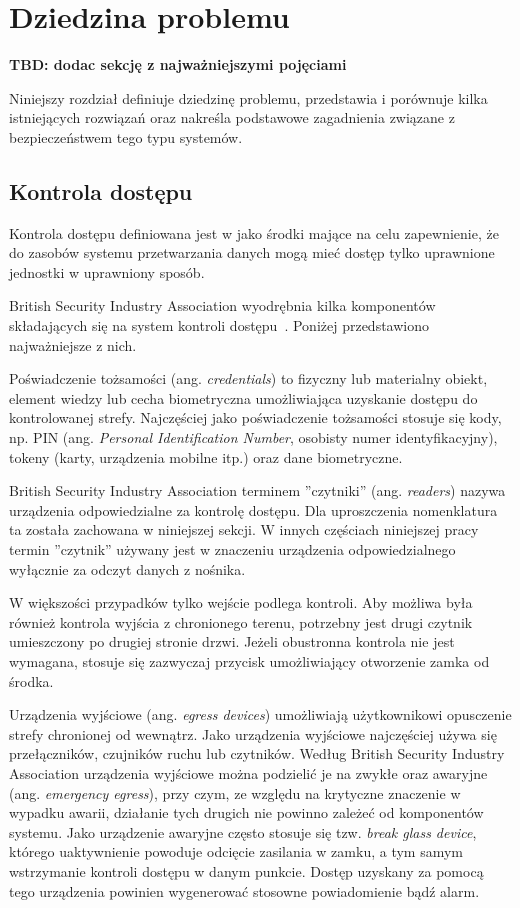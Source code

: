 \chapter{Dziedzina problemu}
\label{chap:problem-domain}
	\textbf{TBD: dodac sekcję z najważniejszymi pojęciami}

	Niniejszy rozdział definiuje dziedzinę problemu, przedstawia i porównuje kilka istniejących rozwiązań oraz nakreśla podstawowe zagadnienia związane z bezpieczeństwem tego typu systemów.

	\section{Kontrola dostępu}

		Kontrola dostępu definiowana jest w \cite{pkn2002} jako środki mające na celu zapewnienie, że do zasobów systemu przetwarzania danych mogą mieć dostęp tylko uprawnione jednostki w uprawniony sposób.

		British Security Industry Association wyodrębnia kilka komponentów składających się na system kontroli dostępu~\cite{bsia2016}. Poniżej przedstawiono najważniejsze z nich.

		Poświadczenie tożsamości (ang. \textit{credentials}) to fizyczny lub materialny obiekt, element wiedzy lub cecha biometryczna umożliwiająca uzyskanie dostępu do kontrolowanej strefy. Najczęściej jako poświadczenie tożsamości stosuje się kody, np. PIN (ang. \textit{Personal Identification Number}, osobisty numer identyfikacyjny), tokeny (karty, urządzenia mobilne itp.) oraz dane biometryczne.

		British Security Industry Association terminem ''czytniki'' (ang. \textit{readers}) nazywa urządzenia odpowiedzialne za kontrolę dostępu. Dla uproszczenia nomenklatura ta została zachowana w niniejszej sekcji. W innych częściach niniejszej pracy termin ''czytnik'' używany jest w znaczeniu urządzenia odpowiedzialnego wyłącznie za odczyt danych z nośnika.

		W większości przypadków tylko wejście podlega kontroli. Aby możliwa była również kontrola wyjścia z chronionego terenu, potrzebny jest drugi czytnik umieszczony po drugiej stronie drzwi. Jeżeli obustronna kontrola nie jest wymagana, stosuje się zazwyczaj przycisk umożliwiający otworzenie zamka od środka.

		Urządzenia wyjściowe (ang. \textit{egress devices}) umożliwiają użytkownikowi opusczenie strefy chronionej od wewnątrz. Jako urządzenia wyjściowe najczęściej używa się przełączników, czujników ruchu lub czytników. Według British Security Industry Association urządzenia wyjściowe można podzielić je na zwykłe oraz awaryjne (ang. \textit{emergency egress}), przy czym, ze względu na krytyczne znaczenie w wypadku awarii, działanie tych drugich nie powinno zależeć od komponentów systemu. Jako urządzenie awaryjne często stosuje się tzw. \textit{break glass device}, którego uaktywnienie powoduje odcięcie zasilania w zamku, a tym samym wstrzymanie kontroli dostępu w danym punkcie. Dostęp uzyskany za pomocą tego urządzenia powinien wygenerować stosowne powiadomienie bądź alarm.


